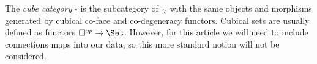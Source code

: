 \begin{remark} The \textit{cube category} $\square$ is the subcategory of $\square_c$ with the same objects and morphisms generated by cubical co-face and co-degeneracy functors. Cubical sets are usually defined as functors $\square^{op} \to \Set$. However, for this article we will need to include connections maps into our data, so this more standard notion will not be considered. 
\end{remark}





